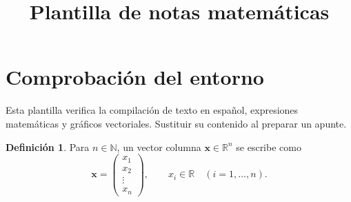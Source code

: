 \documentclass[11pt,a4paper]{article}
\title{Plantilla de notas matemáticas}
\author{}
\date{}
\theoremstyle{definition}
\newtheorem{definicion}[teorema]{Definición}
\begin{document}
\maketitle

\section{Comprobación del entorno}
Esta plantilla verifica la compilación de texto en español, expresiones
matemáticas y gráficos vectoriales. Sustituir su contenido al preparar un apunte.

\begin{definicion}
Para $n\in\mathbb{N}$, un vector columna $\boldsymbol{x}\in\mathbb{R}^{n}$
se escribe como
\[
\boldsymbol{x}=\begin{pmatrix}x_1\\x_2\\\vdots\\x_n\end{pmatrix},
\qquad x_i\in\mathbb{R}\quad (i=1,\ldots,n).
\]
\end{definicion}

\begin{center}
\end{center}
\end{document}
